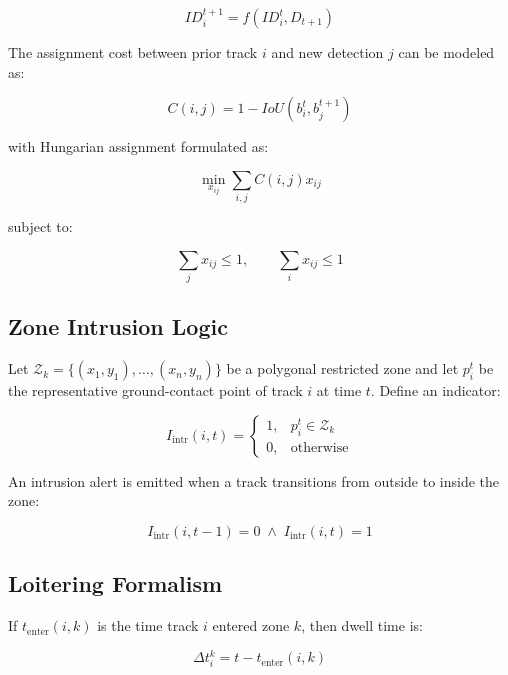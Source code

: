 \documentclass[11pt]{article}
\begin{document}
\begin{equation}
ID_i^{t+1} = f\left(ID_i^t, D_{t+1}\right)
\end{equation}

The assignment cost between prior track $i$ and new detection $j$ can be modeled as:

\begin{equation}
C(i,j) = 1 - IoU\left(b_i^t, b_j^{t+1}\right)
\end{equation}

with Hungarian assignment formulated as:

\begin{equation}
\min_{x_{ij}} \sum_{i,j} C(i,j)x_{ij}
\end{equation}

subject to:

\begin{equation}
\sum_j x_{ij} \leq 1, \qquad \sum_i x_{ij} \leq 1
\end{equation}

\subsection{Zone Intrusion Logic}
Let $\mathcal{Z}_k = \{(x_1,y_1), \ldots, (x_n,y_n)\}$ be a polygonal restricted zone and let $p_i^t$ be the representative ground-contact point of track $i$ at time $t$. Define an indicator:

\begin{equation}
I_{\mathrm{intr}}(i,t) =
\begin{cases}
1, & p_i^t \in \mathcal{Z}_k \\
0, & \text{otherwise}
\end{cases}
\end{equation}

An intrusion alert is emitted when a track transitions from outside to inside the zone:

\begin{equation}
I_{\mathrm{intr}}(i,t-1) = 0 \; \wedge \; I_{\mathrm{intr}}(i,t) = 1
\end{equation}

\subsection{Loitering Formalism}
If $t_{\mathrm{enter}}(i,k)$ is the time track $i$ entered zone $k$, then dwell time is:

\begin{equation}
\Delta t_i^k = t - t_{\mathrm{enter}}(i,k)
\end{equation}
\end{document}
